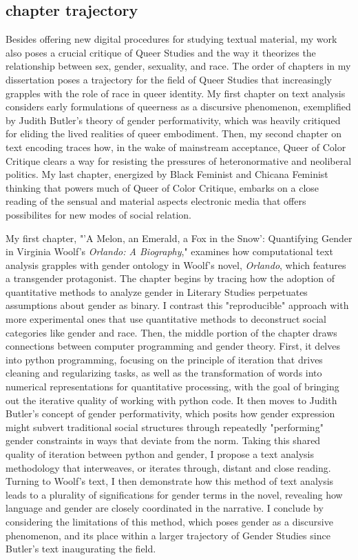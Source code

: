 \documentclass[11pt]{article}
\begin{document}
\subsection{chapter trajectory}
\label{sec:org81e515e}
Besides offering new digital procedures for studying textual material,
my work also poses a crucial critique of Queer Studies and the way it
theorizes the relationship between sex, gender, sexuality, and
race. The order of chapters in my dissertation poses a trajectory for
the field of Queer Studies that increasingly grapples with the role of
race in queer identity. My first chapter on text analysis considers
early formulations of queerness as a discursive phenomenon,
exemplified by Judith Butler’s theory of gender performativity, which
was heavily critiqued for eliding the lived realities of queer
embodiment. Then, my second chapter on text encoding traces how, in
the wake of mainstream acceptance, Queer of Color Critique clears a
way for resisting the pressures of heteronormative and neoliberal
politics. My last chapter, energized by Black Feminist and Chicana
Feminist thinking that powers much of Queer of Color Critique, embarks
on a close reading of the sensual and material aspects electronic
media that offers possibilites for new modes of social relation.

My first chapter, "'A Melon, an Emerald, a Fox in the Snow':
Quantifying Gender in Virginia Woolf's \emph{Orlando: A Biography},"
examines how computational text analysis grapples with gender ontology
in Woolf's novel, \emph{Orlando}, which features a transgender
protagonist. The chapter begins by tracing how the adoption of
quantitative methods to analyze gender in Literary Studies perpetuates
assumptions about gender as binary. I contrast this "reproducible"
approach with more experimental ones that use quantitative methods to
deconstruct social categories like gender and race. Then, the middle
portion of the chapter draws connections between computer programming
and gender theory. First, it delves into python programming, focusing
on the principle of iteration that drives cleaning and regularizing
tasks, as well as the transformation of words into numerical
representations for quantitative processing, with the goal of bringing
out the iterative quality of working with python code. It then moves
to Judith Butler’s concept of gender performativity, which posits how
gender expression might subvert traditional social structures through
repeatedly "performing" gender constraints in ways that deviate from
the norm. Taking this shared quality of iteration between python and
gender, I propose a text analysis methodology that interweaves, or
iterates through, distant and close reading. Turning to Woolf’s text,
I then demonstrate how this method of text analysis leads to a
plurality of significations for gender terms in the novel, revealing
how language and gender are closely coordinated in the narrative. I
conclude by considering the limitations of this method, which poses
gender as a discursive phenomenon, and its place within a larger
trajectory of Gender Studies since Butler's text inaugurating the
field.
\end{document}
